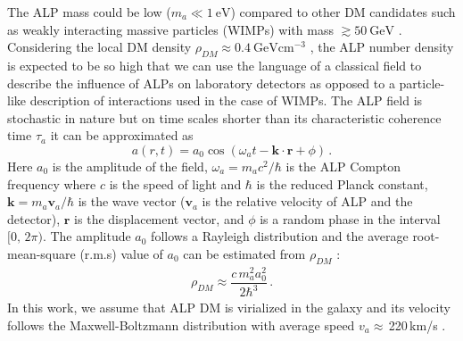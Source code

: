 The ALP mass
could be low ($m_a \ll \SI{1}{\eV}$) compared to other DM candidates such as weakly interacting massive particles (WIMPs) with mass
$\gtrsim\SI{50}{\GeV}$ \cite{Bertone2010_momentWIMP}. 
Considering the local DM density $\rho_{DM}\approx\SI{0.4}{\GeV\cm^{-3}}$ \cite{BERGSTROM1998137, Jungman1992SupersymmetricDM, Sofue_RotationCurves}, the ALP number density is expected to be so high that we can use the language of a classical field to describe the influence of ALPs on laboratory detectors as opposed to a particle-like description of interactions used in the case of WIMPs. The ALP field is stochastic in nature \cite{Centers2021Stochastic} but on time scales shorter than its characteristic coherence time $\tau_a$ it can be approximated as  
\begin{equation}
    a(r,t) = a_0 \cos(\omega_a t - \mathbf{k}\cdot \mathbf{r} + \phi)
    \,.\label{eq:ALP_field}
\end{equation}
Here $a_0$ is the amplitude of the field, $\omega_a = m_a c^2/\hbar$ is the ALP Compton frequency where $c$ is the speed of light and $\hbar$ is the reduced Planck constant, $\mathbf{k} = m_a \mathbf{v}_a/\hbar$ is the wave vector ($\mathbf{v}_a$ is the relative velocity of ALP and the detector), $\mathbf{r}$ is the displacement vector, and $\phi$ is a random phase in the interval $[0,\, 2\pi)$. The amplitude $a_0$ follows a Rayleigh distribution and the average root-mean-square (r.m.s) value of $a_0$ can be estimated from $\rho_{DM}$ \cite{KimballOverview, Centers2021Stochastic, Gramolin2021NaturePhysics}:
\begin{align}
    \rho_{DM} \approx \dfrac{c\, m_a^2 a_0^2}{2\hbar^3}
     \,.\label{eq:rhoDM} 
\end{align}
In this work, we assume that ALP DM is virialized in the galaxy and its velocity follows the Maxwell-Boltzmann distribution with average speed $v_a\approx$\,220\,km/s \cite{Evans2019SHM++_PhysRevD}.
